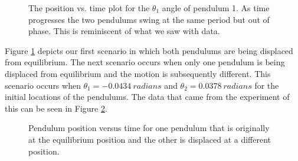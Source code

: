 \documentclass[twocolumn]{article}
\begin{document}
\begin{figure}[htb!]
\begin{center}
\caption{The position vs. time plot for the $\theta_1$ angle of pendulum 1. As time progresses the two pendulums swing at the same period but out of phase. This is reminiscent of what we saw with data.}
\label{LR2}
\end{center}
\end{figure}
\newpage
Figure \ref{LR2} depicts our first scenario in which both pendulums are being displaced from equilibrium. The next scenario occurs when only one pendulum is being displaced from equilibrium and the motion is subsequently different. This scenario occurs when $\theta_{1}=-0.0434\ radians$ and $\theta_{2}=0.0378\ radians$ for the initial locations of the pendulums. The data that came from the experiment of this can be seen in Figure \ref{CR1}.
\begin{figure}[htb!]
\begin{center}
\caption{Pendulum position versus time for one pendulum that is originally at the equilibrium position and the other is displaced at a different position.}
\label{CR1}
\end{center}
\end{figure}
\end{document}
